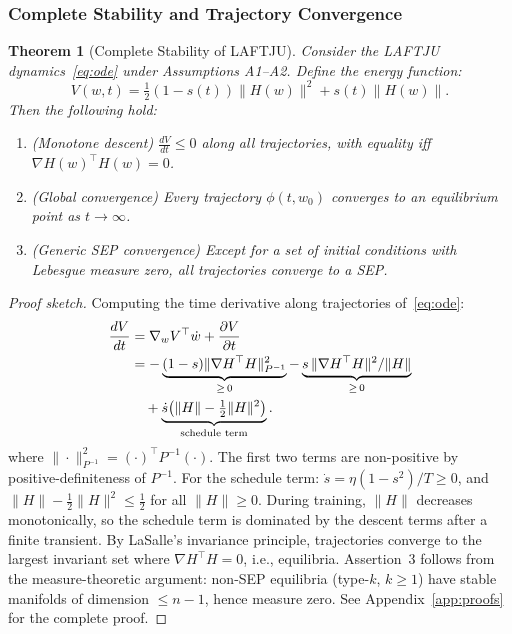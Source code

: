 \documentclass[10pt,twocolumn]{article}
\newtheorem{theorem}{Theorem}
\newcommand{\method}{LAFTJU}
\begin{document}
\subsubsection{Complete Stability and Trajectory Convergence}

\begin{theorem}[Complete Stability of \method{}]
\label{thm:stability}
Consider the \method{} dynamics~\eqref{eq:ode} under Assumptions A1--A2. Define the energy function:
\begin{equation}
V(w,t) = \tfrac{1}{2}(1-s(t))\|H(w)\|^2 + s(t)\|H(w)\|.
\label{eq:lyapunov}
\end{equation}
Then the following hold:
\begin{enumerate}
\item (Monotone descent) $\frac{dV}{dt} \leq 0$ along all trajectories, with equality iff $\nabla H(w)^\top H(w) = 0$.
\item (Global convergence) Every trajectory $\phi(t, w_0)$ converges to an equilibrium point as $t \to \infty$.
\item (Generic SEP convergence) Except for a set of initial conditions with Lebesgue measure zero, all trajectories converge to a SEP.
\end{enumerate}
\end{theorem}

\begin{proof}[Proof sketch]
Computing the time derivative along trajectories of~\eqref{eq:ode}:
\begin{align}
\frac{dV}{dt} &= \nabla_w V^\top \dot{w} + \frac{\partial V}{\partial t} \notag \\
&= -\underbrace{(1-s)\|\nabla H^\top H\|_{P^{-1}}^2}_{\geq\, 0} - \underbrace{s\,\|\nabla H^\top H\|^2 / \|H\|}_{\geq\, 0} \notag \\
&\quad + \underbrace{\dot{s}\bigl(\|H\| - \tfrac{1}{2}\|H\|^2\bigr)}_{\text{schedule term}}.
\label{eq:dVdt}
\end{align}
where $\|\cdot\|_{P^{-1}}^2 = (\cdot)^\top P^{-1}(\cdot)$. The first two terms are non-positive by positive-definiteness of $P^{-1}$. For the schedule term: $\dot{s} = \eta(1-s^2)/T \geq 0$, and $\|H\| - \frac{1}{2}\|H\|^2 \leq \frac{1}{2}$ for all $\|H\| \geq 0$. During training, $\|H\|$ decreases monotonically, so the schedule term is dominated by the descent terms after a finite transient. By LaSalle's invariance principle, trajectories converge to the largest invariant set where $\nabla H^\top H = 0$, i.e., equilibria. Assertion~3 follows from the measure-theoretic argument: non-SEP equilibria (type-$k$, $k \geq 1$) have stable manifolds of dimension $\leq n-1$, hence measure zero. See Appendix~\ref{app:proofs} for the complete proof.
\end{proof}
\end{document}
